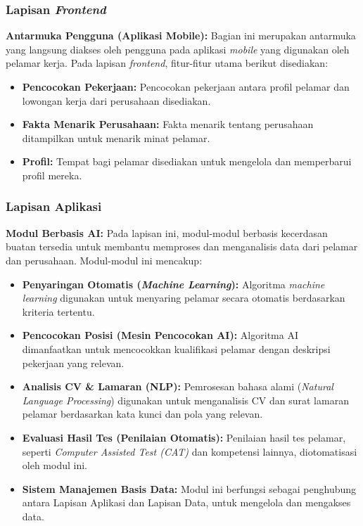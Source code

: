 \documentclass[journal,article,submit,pdftex,moreauthors]{Definitions/mdpi}
\begin{document}
\subsubsection{Lapisan \textit{Frontend}}
\textbf{Antarmuka Pengguna (Aplikasi Mobile):} Bagian ini merupakan antarmuka yang langsung diakses oleh pengguna pada aplikasi \textit{mobile} yang digunakan oleh pelamar kerja. Pada lapisan \textit{frontend}, fitur-fitur utama berikut disediakan:  
\begin{itemize}[left=2em]
    \item \textbf{Pencocokan Pekerjaan:} Pencocokan pekerjaan antara profil pelamar dan lowongan kerja dari perusahaan disediakan.
    \item \textbf{Fakta Menarik Perusahaan:} Fakta menarik tentang perusahaan ditampilkan untuk menarik minat pelamar.
    \item \textbf{Profil:} Tempat bagi pelamar disediakan untuk mengelola dan memperbarui profil mereka.
\end{itemize}

\subsubsection{Lapisan Aplikasi}
\textbf{Modul Berbasis AI:} Pada lapisan ini, modul-modul berbasis kecerdasan buatan tersedia untuk membantu memproses dan menganalisis data dari pelamar dan perusahaan. Modul-modul ini mencakup:  
\begin{itemize}[left=2em]
    \item \textbf{Penyaringan Otomatis (\textit{Machine Learning}):} Algoritma \textit{machine learning} digunakan untuk menyaring pelamar secara otomatis berdasarkan kriteria tertentu.
    \item \textbf{Pencocokan Posisi (Mesin Pencocokan AI):} Algoritma AI dimanfaatkan untuk mencocokkan kualifikasi pelamar dengan deskripsi pekerjaan yang relevan.
    \item \textbf{Analisis CV \& Lamaran (NLP):} Pemrosesan bahasa alami (\textit{Natural Language Processing}) digunakan untuk menganalisis CV dan surat lamaran pelamar berdasarkan kata kunci dan pola yang relevan.
    \item \textbf{Evaluasi Hasil Tes (Penilaian Otomatis):} Penilaian hasil tes pelamar, seperti \textit{Computer Assisted Test (CAT)} dan kompetensi lainnya, diotomatisasi oleh modul ini.
    \item \textbf{Sistem Manajemen Basis Data:} Modul ini berfungsi sebagai penghubung antara Lapisan Aplikasi dan Lapisan Data, untuk mengelola dan mengakses data.
\end{itemize}
\end{document}

